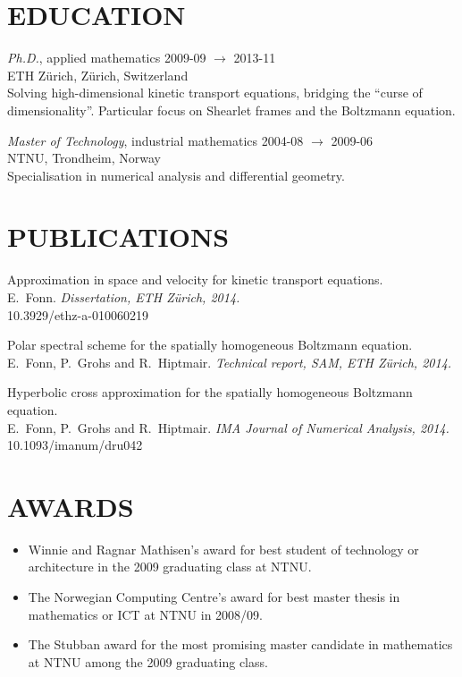 \documentclass[line,margin]{res}
\newcommand{\zh}{Z\"{u}rich}
\begin{document}
\address{Høgreina 394, NO-7079 Flatåsen}
\address{+41 78 634 68 37, eivind.fonn@sintef.no}


\begin{resume}


\section{EDUCATION} 

{\em Ph.D.}, applied mathematics \hfill 2009-09 $\to$ 2013-11 \\
ETH \zh, \zh, Switzerland \\
Solving high-dimensional kinetic transport equations, bridging the ``curse of
dimensionality''. Particular focus on Shearlet frames and the Boltzmann equation.

{\em Master of Technology}, industrial mathematics \hfill 2004-08 $\to$ 2009-06 \\
NTNU, Trondheim, Norway \\
Specialisation in numerical analysis and differential geometry.


\section{PUBLICATIONS}

Approximation in space and velocity for kinetic transport equations. \\
E.~Fonn.  {\em Dissertation, ETH \zh, 2014.} \\
10.3929/ethz-a-010060219

Polar spectral scheme for the spatially homogeneous Boltzmann equation. \\
E.~Fonn, P.~Grohs and R.~Hiptmair.  {\em Technical report, SAM, ETH \zh, 2014.}

Hyperbolic cross approximation for the spatially homogeneous Boltzmann equation. \\
E.~Fonn, P.~Grohs and R.~Hiptmair.  {\em IMA Journal of Numerical Analysis, 2014.} \\
10.1093/imanum/dru042


\section{AWARDS}

\begin{itemize}
\item Winnie and Ragnar Mathisen's award for best student of technology
  or architecture in the 2009 graduating class at NTNU.
\item The Norwegian Computing Centre's award for best master thesis in
  mathematics or ICT at NTNU in 2008/09.
\item The Stubban award for the most promising master candidate in
  mathematics at NTNU among the 2009 graduating class.
\end{itemize}


\end{resume}
\end{document}
